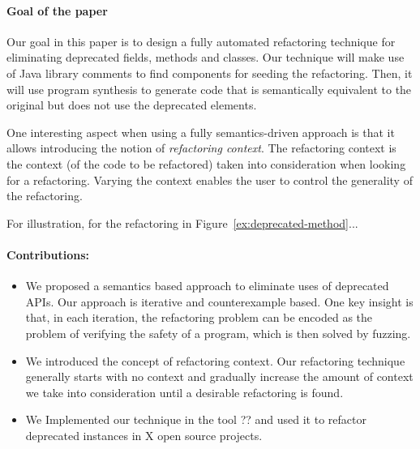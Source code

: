 \documentclass[runningheads,a4paper]{llncs}
\begin{document}


\paragraph{Goal of the paper} 
Our goal in this paper is to design a fully automated refactoring
technique for eliminating deprecated fields, methods and classes. Our
technique will make use of Java library comments to find components
for seeding the refactoring. Then, it will use program synthesis to
generate code that is semantically equivalent to the original but does not use
the deprecated elements.

One interesting aspect when using a fully semantics-driven approach is
that it allows introducing the notion of {\em refactoring context}.
The refactoring context is the context (of the code to be refactored)
taken into consideration when looking for a refactoring. Varying the
context enables the user to control the generality of the refactoring.


For illustration, for the refactoring in Figure~\ref{ex:deprecated-method}...



\paragraph{Contributions:}

\begin{itemize}

\item We proposed a semantics based approach to eliminate uses of deprecated APIs. Our approach
  is iterative and counterexample based. One key insight is that, in each iteration, the refactoring problem can
  be encoded as the problem of verifying the safety of a program, which is then solved by fuzzing.

\item We introduced the concept of refactoring context. %
  Our refactoring technique generally starts 
  with no context and gradually increase the amount of context we take into consideration
  until a desirable refactoring is found.

\item We Implemented our technique in the tool ?? and used it to
  refactor deprecated instances in X open source projects.
  
\end{itemize}  
\end{document}

